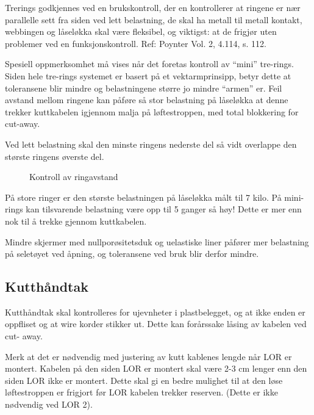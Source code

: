 Trerings godkjennes ved en brukskontroll, der en kontrollerer at ringene er nær parallelle sett fra siden ved lett belastning, de skal ha metall til metall kontakt, webbingen og låseløkka skal være fleksibel, og viktigst: at de frigjør uten problemer ved en funksjonskontroll. Ref: Poynter Vol. 2, 4.114, s. 112.

Spesiell oppmerksomhet må vises når det foretas kontroll av ``mini'' tre-rings. Siden hele tre-rings systemet er basert på et vektarmprinsipp, betyr dette at toleransene blir mindre og belastningene større jo mindre ``armen'' er. Feil avstand mellom ringene kan påføre så stor belastning på låseløkka at denne trekker kuttkabelen igjennom malja på løftestroppen, med total blokkering for cut-away.

Ved lett belastning skal den minste ringens nederste del så vidt overlappe den største ringens øverste del.
\begin{figure}
	\caption{Kontroll av ringavstand}
\end{figure}

På store ringer er den største belastningen på låseløkka målt til 7 kilo. På mini-rings kan tilsvarende belastning være opp til 5 ganger så høy! Dette er mer enn nok til å trekke gjennom kuttkabelen.

Mindre skjermer med nullporøsitetsduk og uelastiske liner påfører mer belastning på seletøyet ved åpning, og toleransene ved bruk blir derfor mindre.

\subsection{Kutthåndtak}
Kutthåndtak skal kontrolleres for ujevnheter i plastbelegget, og at ikke enden er oppfliset og at wire korder stikker ut. Dette kan forårssake låsing av kabelen ved cut- away.

Merk at det er nødvendig med justering av kutt kablenes lengde når LOR er montert. Kabelen på den siden LOR er montert skal være 2-3 cm lenger enn den siden LOR ikke er montert. Dette skal gi en bedre mulighet til at den løse løftestroppen er frigjort før LOR kabelen trekker reserven. (Dette er ikke nødvendig ved LOR 2).

